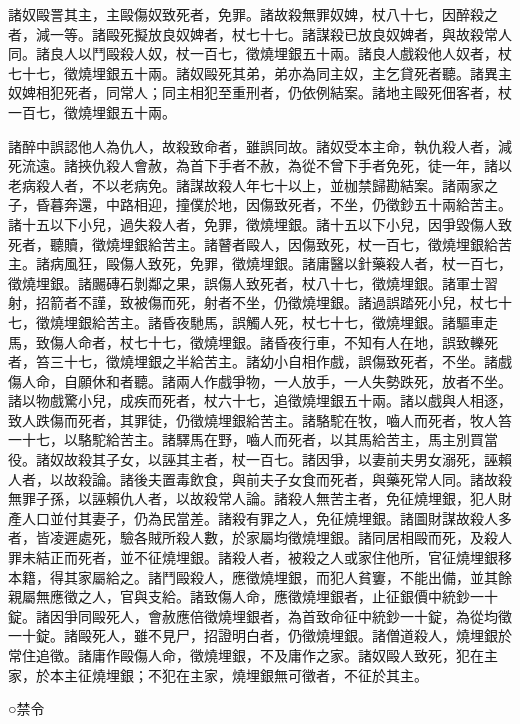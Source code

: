\begin{pinyinscope}
 諸奴毆詈其主，主毆傷奴致死者，免罪。諸故殺無罪奴婢，杖八十七，因醉殺之者，減一等。諸毆死擬放良奴婢者，杖七十七。諸謀殺已放良奴婢者，與故殺常人同。諸良人以鬥毆殺人奴，杖一百七，徵燒埋銀五十兩。諸良人戲殺他人奴者，杖七十七，徵燒埋銀五十兩。諸奴毆死其弟，弟亦為同主奴，主乞貸死者聽。諸異主奴婢相犯死者，同常人；同主相犯至重刑者，仍依例結案。諸地主毆死佃客者，杖一百七，徵燒埋銀五十兩。



 諸醉中誤認他人為仇人，故殺致命者，雖誤同故。諸奴受本主命，執仇殺人者，減死流遠。諸挾仇殺人會赦，為首下手者不赦，為從不曾下手者免死，徒一年，諸以老病殺人者，不以老病免。諸謀故殺人年七十以上，並枷禁歸勘結案。諸兩家之子，昏暮奔還，中路相迎，撞僕於地，因傷致死者，不坐，仍徵鈔五十兩給苦主。諸十五以下小兒，過失殺人者，免罪，徵燒埋銀。諸十五以下小兒，因爭毀傷人致死者，聽贖，徵燒埋銀給苦主。諸瞽者毆人，因傷致死，杖一百七，徵燒埋銀給苦主。諸病風狂，毆傷人致死，免罪，徵燒埋銀。諸庸醫以針藥殺人者，杖一百七，徵燒埋銀。諸颺磚石剝鄰之果，誤傷人致死者，杖八十七，徵燒埋銀。諸軍士習射，招箭者不謹，致被傷而死，射者不坐，仍徵燒埋銀。諸過誤踏死小兒，杖七十七，徵燒埋銀給苦主。諸昏夜馳馬，誤觸人死，杖七十七，徵燒埋銀。諸驅車走馬，致傷人命者，杖七十七，徵燒埋銀。諸昏夜行車，不知有人在地，誤致轢死者，笞三十七，徵燒埋銀之半給苦主。諸幼小自相作戲，誤傷致死者，不坐。諸戲傷人命，自願休和者聽。諸兩人作戲爭物，一人放手，一人失勢跌死，放者不坐。諸以物戲驚小兒，成疾而死者，杖六十七，追徵燒埋銀五十兩。諸以戲與人相逐，致人跌傷而死者，其罪徒，仍徵燒埋銀給苦主。諸駱駝在牧，嚙人而死者，牧人笞一十七，以駱駝給苦主。諸驛馬在野，嚙人而死者，以其馬給苦主，馬主別買當役。諸奴故殺其子女，以誣其主者，杖一百七。諸因爭，以妻前夫男女溺死，誣賴人者，以故殺論。諸後夫置毒飲食，與前夫子女食而死者，與藥死常人同。諸故殺無罪子孫，以誣賴仇人者，以故殺常人論。諸殺人無苦主者，免征燒埋銀，犯人財產人口並付其妻子，仍為民當差。諸殺有罪之人，免征燒埋銀。諸圖財謀故殺人多者，皆凌遲處死，驗各賊所殺人數，於家屬均徵燒埋銀。諸同居相毆而死，及殺人罪未結正而死者，並不征燒埋銀。諸殺人者，被殺之人或家住他所，官征燒埋銀移本籍，得其家屬給之。諸鬥毆殺人，應徵燒埋銀，而犯人貧窶，不能出備，並其餘親屬無應徵之人，官與支給。諸致傷人命，應徵燒埋銀者，止征銀價中統鈔一十錠。諸因爭同毆死人，會赦應倍徵燒埋銀者，為首致命征中統鈔一十錠，為從均徵一十錠。諸毆死人，雖不見尸，招證明白者，仍徵燒埋銀。諸僧道殺人，燒埋銀於常住追徵。諸庸作毆傷人命，徵燒埋銀，不及庸作之家。諸奴毆人致死，犯在主家，於本主征燒埋銀；不犯在主家，燒埋銀無可徵者，不征於其主。



 ○禁令




\end{pinyinscope}
